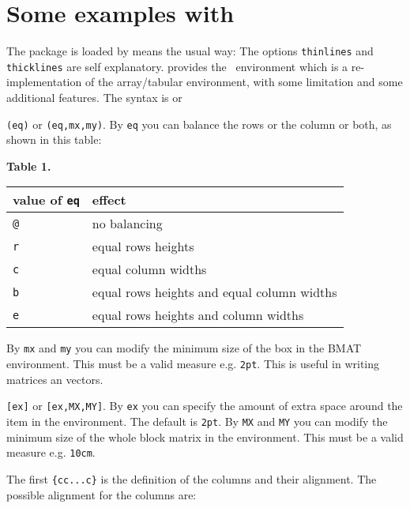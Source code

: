 \documentclass[a4paper,final,11pt]{article}
\begin{document}
\section{Some examples with }
The package is loaded by means the usual way:
The options \texttt{thinlines} and \texttt{thicklines} are self
explanatory.   provides the
~environment which is a re-implementation of the
array/tabular environment, with some limitation and some additional
features.  The syntax is
or 
\begin{dotlist}
  \item
  \verb|(eq)| or \verb|(eq,mx,my)|.  By \verb|eq| you can balance
  the rows or the column or both, as shown in this table:
  \begin{center}
    \par
    \textbf{Table 1.}\nobreak\\[1em]
    \begin{tabular}{|l|l|}
      \hline
      value of \verb|eq| & effect \\
      \hline
      \verb|@| & no balancing \\
      \verb|r| & equal rows heights \\
      \verb|c| & equal column widths  \\
      \verb|b| & equal rows heights and equal column widths \\
      \verb|e| & equal rows heights and column widths \\
      \hline
    \end{tabular}
    \par
  \end{center}
  By \verb|mx| and \verb|my| you can modify the minimum size of the
  box in the BMAT environment.  This must be a valid measure e.g.
  \verb|2pt|.  This is useful in writing matrices an vectors.
  \item
  \verb|[ex]| or \verb|[ex,MX,MY]|.  By \verb|ex| you can specify
  the amount of extra space around the item in the 
  environment.  The default is \verb|2pt|.  By \verb|MX| and \verb|MY|
  you can modify the minimum size of the whole block matrix in the
   environment.  This must be a valid measure e.g.
  \verb|10cm|.
  \item
  The first \verb|{cc...c}| is the definition of the columns and
  their alignment.  The possible alignment for the columns are:

\end{dotlist}
\end{document}

